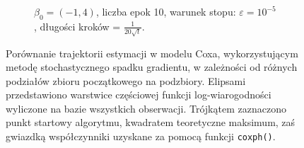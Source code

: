 \begin{figure}[hbt!]
\begin{center}
\begin{subfigure}[h!]{0.9\textwidth}
            \caption{$\beta_0=(-1,4)$, liczba epok 10, warunek stopu: $\varepsilon=10^{-5}$, długości kroków = $\frac{1}{20\sqrt{t}}$.}
   \end{subfigure}  
      \end{center}
  \caption[Porównanie estymacji w modelu Coxa metodą stochastycznego spadku gradientu dla różnych podziałów zbioru początkowego na podzbiory.]{\label{rysCox4}Porównanie trajektorii estymacji w modelu Coxa, wykorzystującym metodę stochastycznego spadku gradientu, w zależności od różnych podziałów zbioru początkowego na podzbiory. Elipsami przedstawiono warstwice częściowej funkcji log-wiarogodności wyliczone na bazie wszystkich obserwacji. Trójkątem zaznaczono punkt startowy algorytmu, kwadratem teoretyczne maksimum, zaś gwiazdką współczynniki uzyskane za pomocą funkcji \texttt{coxph()}.}
\end{figure}